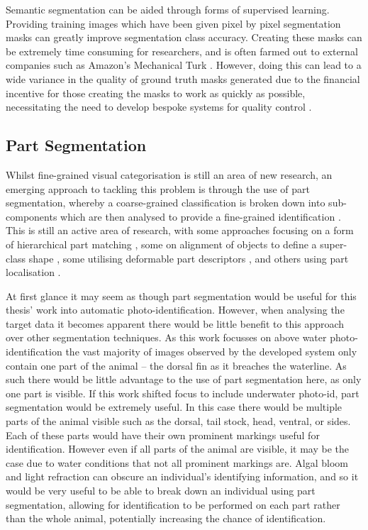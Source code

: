 Semantic segmentation can be aided through forms of supervised learning. Providing training images which have been given pixel by pixel segmentation masks can greatly improve segmentation class accuracy. Creating these masks can be extremely time consuming for researchers, and is often farmed out to external companies such as Amazon's Mechanical Turk \cite{buhrmester_amazons_2011}. However, doing this can lead to a wide variance in the quality of ground truth masks generated due to the financial incentive for those creating the masks to work as quickly as possible, necessitating the need to develop bespoke systems for quality control \cite{maji_large_2011}.

\subsection{Part Segmentation}\label{ch:Background,sec:Fine-grainedCV,sub:PartSegmentation}

Whilst fine-grained visual categorisation is still an area of new research, an emerging approach to tackling this problem is through the use of part segmentation, whereby a coarse-grained classification is broken down into sub-components which are then analysed to provide a fine-grained identification \cite{zhang_part-based_2014}. This is still an active area of research, with some approaches focusing on a form of hierarchical part matching \cite{xie_hierarchical_2013}, some on alignment of objects to define a super-class shape \cite{gavves_fine-grained_2013}, some utilising deformable part descriptors \cite{zhang_deformable_2013}, and others using part localisation \cite{liu_dog_2012}.

At first glance it may seem as though part segmentation would be useful for this thesis' work into automatic photo-identification. However, when analysing the target data it becomes apparent there would be little benefit to this approach over other segmentation techniques. As this work focusses on above water photo-identification the vast majority of images observed by the developed system only contain one part of the animal -- the dorsal fin as it breaches the waterline.  As such there would be little advantage to the use of part segmentation here, as only one part is visible. If this work shifted focus to include underwater photo-id, part segmentation would be extremely useful. In this case there would be multiple parts of the animal visible such as the dorsal, tail stock, head, ventral, or sides. Each of these parts would have their own prominent markings useful for identification. However even if all parts of the animal are visible, it may be the case due to water conditions that not all prominent markings are. Algal bloom and light refraction can obscure an individual's identifying information, and so it would be very useful to be able to break down an individual using part segmentation, allowing for identification to be performed on each part rather than the whole animal, potentially increasing the chance of identification.  

